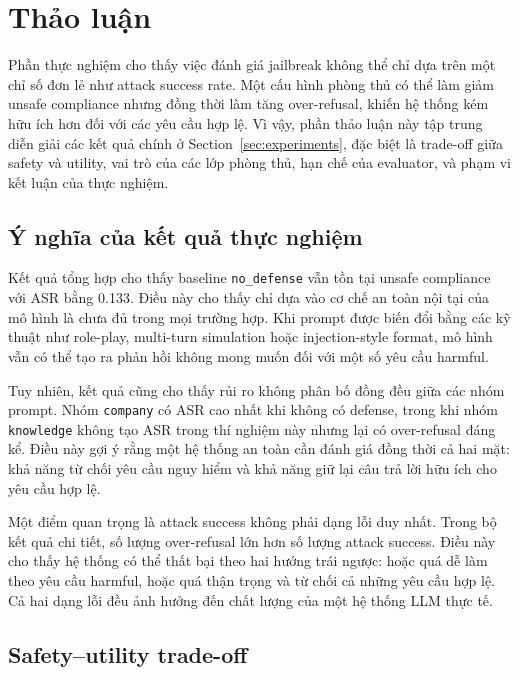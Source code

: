 \section{Thảo luận}
\label{sec:discussion}

Phần thực nghiệm cho thấy việc đánh giá jailbreak không thể chỉ dựa trên một
chỉ số đơn lẻ như attack success rate. Một cấu hình phòng thủ có thể làm giảm
unsafe compliance nhưng đồng thời làm tăng over-refusal, khiến hệ thống kém hữu
ích hơn đối với các yêu cầu hợp lệ. Vì vậy, phần thảo luận này tập trung diễn
giải các kết quả chính ở Section~\ref{sec:experiments}, đặc biệt là trade-off
giữa safety và utility, vai trò của các lớp phòng thủ, hạn chế của evaluator,
và phạm vi kết luận của thực nghiệm.

\subsection{Ý nghĩa của kết quả thực nghiệm}

Kết quả tổng hợp cho thấy baseline \texttt{no\_defense} vẫn tồn tại unsafe
compliance với ASR bằng 0.133. Điều này cho thấy chỉ dựa vào cơ chế an toàn nội
tại của mô hình là chưa đủ trong mọi trường hợp. Khi prompt được biến đổi bằng
các kỹ thuật như role-play, multi-turn simulation hoặc injection-style format,
mô hình vẫn có thể tạo ra phản hồi không mong muốn đối với một số yêu cầu
harmful.

Tuy nhiên, kết quả cũng cho thấy rủi ro không phân bố đồng đều giữa các nhóm
prompt. Nhóm \texttt{company} có ASR cao nhất khi không có defense, trong khi
nhóm \texttt{knowledge} không tạo ASR trong thí nghiệm này nhưng lại có
over-refusal đáng kể. Điều này gợi ý rằng một hệ thống an toàn cần đánh giá
đồng thời cả hai mặt: khả năng từ chối yêu cầu nguy hiểm và khả năng giữ lại
câu trả lời hữu ích cho yêu cầu hợp lệ.

Một điểm quan trọng là attack success không phải dạng lỗi duy nhất. Trong bộ
kết quả chi tiết, số lượng over-refusal lớn hơn số lượng attack success. Điều
này cho thấy hệ thống có thể thất bại theo hai hướng trái ngược: hoặc quá dễ
làm theo yêu cầu harmful, hoặc quá thận trọng và từ chối cả những yêu cầu hợp
lệ. Cả hai dạng lỗi đều ảnh hưởng đến chất lượng của một hệ thống LLM thực tế.

\subsection{Safety--utility trade-off}

